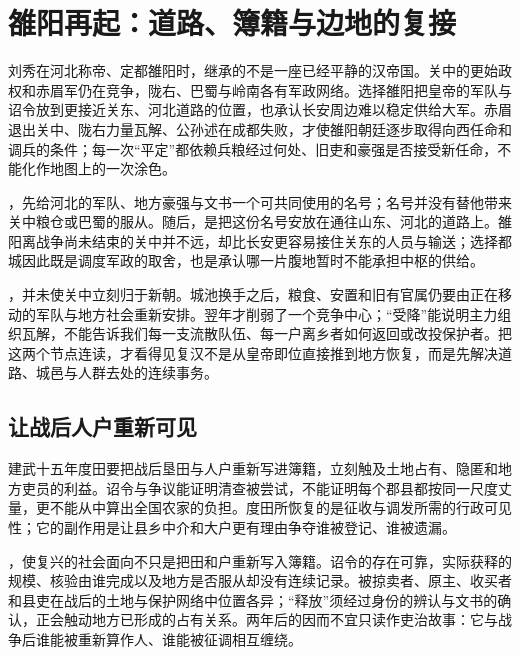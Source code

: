 \section{雒阳再起：道路、簿籍与边地的复接}
\label{sec:eastern-han-restoration}

刘秀在河北称帝、定都雒阳时，继承的不是一座已经平静的汉帝国。关中的更始政权和赤眉军仍在竞争，陇右、巴蜀与岭南各有军政网络。选择雒阳把皇帝的军队与诏令放到更接近关东、河北道路的位置，也承认长安周边难以稳定供给大军。赤眉退出关中、陇右力量瓦解、公孙述在成都失败，才使雒阳朝廷逐步取得向西任命和调兵的条件；每一次“平定”都依赖兵粮经过何处、旧吏和豪强是否接受新任命，不能化作地图上的一次涂色。

，先给河北的军队、地方豪强与文书一个可共同使用的名号；名号并没有替他带来关中粮仓或巴蜀的服从。随后，是把这份名号安放在通往山东、河北的道路上。雒阳离战争尚未结束的关中并不远，却比长安更容易接住关东的人员与输送；选择都城因此既是调度军政的取舍，也是承认哪一片腹地暂时不能承担中枢的供给。

，并未使关中立刻归于新朝。城池换手之后，粮食、安置和旧有官属仍要由正在移动的军队与地方社会重新安排。翌年才削弱了一个竞争中心；“受降”能说明主力组织瓦解，不能告诉我们每一支流散队伍、每一户离乡者如何返回或改投保护者。把这两个节点连读，才看得见复汉不是从皇帝即位直接推到地方恢复，而是先解决道路、城邑与人群去处的连续事务。

\subsection{让战后人户重新可见}

建武十五年度田要把战后垦田与人户重新写进簿籍，立刻触及土地占有、隐匿和地方吏员的利益。诏令与争议能证明清查被尝试，不能证明每个郡县都按同一尺度丈量，更不能从中算出全国农家的负担。度田所恢复的是征收与调发所需的行政可见性；它的副作用是让县乡中介和大户更有理由争夺谁被登记、谁被遗漏。

，使复兴的社会面向不只是把田和户重新写入簿籍。诏令的存在可靠，实际获释的规模、核验由谁完成以及地方是否服从却没有连续记录。被掠卖者、原主、收买者和县吏在战后的土地与保护网络中位置各异；“释放”须经过身份的辨认与文书的确认，正会触动地方已形成的占有关系。两年后的因而不宜只读作吏治故事：它与战争后谁能被重新算作人、谁能被征调相互缠绕。

